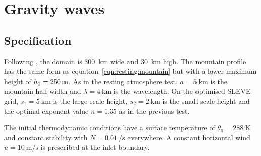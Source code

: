 \section{Gravity waves}
\label{sec:gw}


\subsection{Specification}
Following \textcite{melvin2010}, the domain is \SI{300}{\kilo\meter} wide and \SI{30}{\kilo\meter} high.  The mountain profile has the same form as equation~\ref{eqn:resting:mountain} but with a lower maximum height of $h_0 = \SI{250}{\meter}$.  As in the resting atmosphere test, $a = \SI{5}{\kilo\meter}$ is the mountain half-width and $\lambda = \SI{4}{\kilo\meter}$ is the wavelength.  On the optimised SLEVE grid, $s_1 = \SI{5}{\kilo\meter}$ is the large scale height, $s_2 = \SI{2}{\kilo\meter}$ is the small scale height and the optimal exponent value $n = 1.35$ as in the previous test.

The initial thermodynamic conditions have a surface temperature of $\theta_0 = \SI{288}{\kelvin}$ and constant stability with $N = \SI{0.01}{\per\second}$ everywhere.  A constant horizontal wind $u = \SI{10}{\meter\per\second}$ is prescribed at the inlet boundary.

